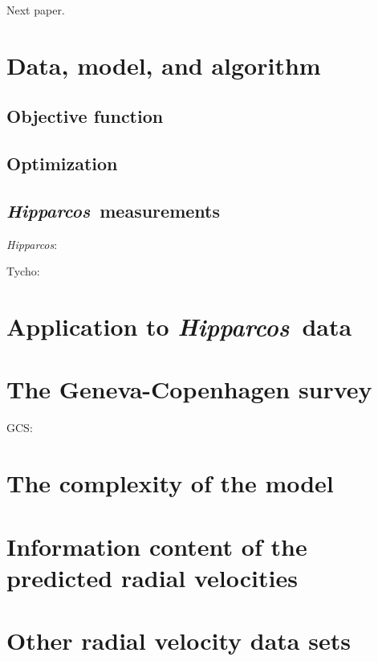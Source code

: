 \documentclass[12pt,preprint]{aastex}
\newcommand{\Hipparcos}{\textit{Hipparcos}}
\newcommand{\Tycho}{Tycho}
\begin{document}
Next paper.







\section{Data, model, and algorithm}


\subsection{Objective function}

\citep{1991PASP..103...95N,1993AJ....105.1455N}

\subsection{Optimization}


\subsection{\Hipparcos\ measurements}
\Hipparcos:
\citep{ESA97a,2007ASSL..250.....V,2007A&A...474..653V}

\Tycho:
\citep{ESA97a,2000A&A...355L..27H,2000A&A...357..367H}





\section{Application to \Hipparcos\ data}


\section{The Geneva-Copenhagen survey}
GCS:
\citep{2004A&A...418..989N,2007A&A...475..519H,2008arXiv0811.3982H}

\section{The complexity of the model}


\section{Information content of the predicted radial velocities}


\section{Other radial velocity data sets}




\end{document}
